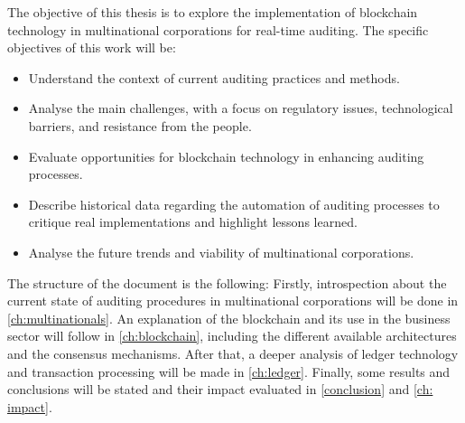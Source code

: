 The objective of this thesis is to explore the implementation of blockchain technology in multinational corporations for real-time auditing. The specific objectives of this work will be:
\begin{itemize}
    \item Understand the context of current auditing practices and methods.
    \item Analyse the main challenges, with a focus on regulatory issues, technological barriers, and resistance from the people.
    \item Evaluate opportunities for blockchain technology in enhancing auditing processes.
    \item Describe historical data regarding the automation of auditing processes to critique real implementations and highlight lessons learned.
    \item Analyse the future trends and viability of multinational corporations.
\end{itemize}

The structure of the document is the following: Firstly, introspection about the current state of auditing procedures in multinational corporations will be done in \cref{ch:multinationals}. An explanation of the blockchain and its use in the business sector will follow in \cref{ch:blockchain}, including the different available architectures and the consensus mechanisms. After that, a deeper analysis of ledger technology and transaction processing will be made in \cref{ch:ledger}. Finally, some results and conclusions will be stated and their impact evaluated in \cref{conclusion} and \cref{ch: impact}. 

